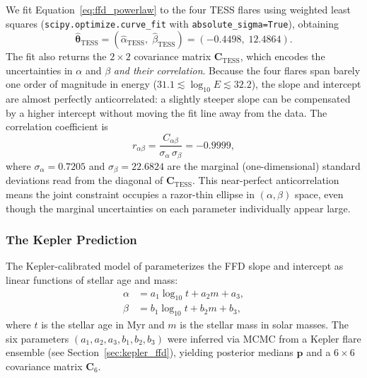 We fit Equation~\ref{eq:ffd_powerlaw} to the four TESS flares using
weighted least squares (\texttt{scipy.optimize.curve\_fit} with
\texttt{absolute\_sigma=True}), obtaining
\begin{equation}
\hat{\boldsymbol{\theta}}_{\mathrm{TESS}} =
  (\hat{\alpha}_{\mathrm{TESS}},\; \hat{\beta}_{\mathrm{TESS}}) =
  (-0.4498,\; 12.4864).
\end{equation}
The fit also returns the $2 \times 2$ covariance matrix
$\mathbf{C}_{\mathrm{TESS}}$, which encodes the uncertainties in
$\alpha$ and $\beta$ \emph{and their correlation}.  Because the four
flares span barely one order of magnitude in energy ($31.1 \lesssim
\log_{10} E \lesssim 32.2$), the slope and intercept are almost
perfectly anticorrelated: a slightly steeper slope can be compensated
by a higher intercept without moving the fit line away from the data.
The correlation coefficient is
\begin{equation}
r_{\alpha\beta} =
  \frac{C_{\alpha\beta}}{\sigma_\alpha \, \sigma_\beta} = -0.9999,
\end{equation}
where $\sigma_\alpha = 0.7205$ and $\sigma_\beta = 22.6824$ are the
marginal (one-dimensional) standard deviations read from the diagonal
of $\mathbf{C}_{\mathrm{TESS}}$.  This near-perfect anticorrelation
means the joint constraint occupies a razor-thin ellipse in $(\alpha,
\beta)$ space, even though the marginal uncertainties on each
parameter individually appear large.

\subsubsection{The Kepler Prediction}

The Kepler-calibrated model of \citet{Davenport2019} parameterizes the
FFD slope and intercept as linear functions of stellar age and mass:
\begin{align}
\alpha &= a_1 \log_{10} t + a_2 m + a_3,
  \label{eq:alpha_model} \\
\beta  &= b_1 \log_{10} t + b_2 m + b_3,
  \label{eq:beta_model}
\end{align}
where $t$ is the stellar age in Myr and $m$ is the stellar mass in
solar masses.  The six parameters $(a_1, a_2, a_3, b_1, b_2, b_3)$
were inferred via MCMC from a Kepler flare ensemble (see
Section~\ref{sec:kepler_ffd}), yielding posterior medians
$\boldsymbol{p}$ and a $6 \times 6$ covariance matrix
$\mathbf{C}_{6}$.

